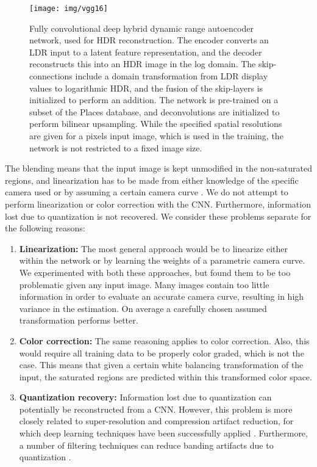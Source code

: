 \documentclass[acmtog]{acmart}
\newcommand\belowfigspace{-2pt}
\begin{document}
\begin{figure*}
	\centering
	\texttt{[image: img/vgg16]}
	\vspace{-1mm}
	\caption{\label{fig:network} Fully convolutional deep hybrid dynamic range autoencoder network, used for HDR reconstruction. The encoder converts an LDR input to a latent feature representation, and the decoder reconstructs this into an HDR image in the log domain. The skip-connections include a domain transformation from LDR display values to logarithmic HDR, and the fusion of the skip-layers is initialized to perform an addition. The network is pre-trained on a subset of the Places database, and deconvolutions are initialized to perform bilinear upsampling. While the specified spatial resolutions are given for a  pixels input image, which is used in the training, the network is not restricted to a fixed image size.}
	\vspace{\belowfigspace}
\end{figure*}

The blending means that the input image is kept unmodified in the non-saturated regions, and linearization has to be made from either knowledge of the specific camera used or by assuming a certain camera curve . We do not attempt to perform linearization or color correction with the CNN. Furthermore, information lost due to quantization is not recovered. We consider these problems separate for the following reasons:
\begin{enumerate}
	\item {\bf Linearization:} The most general approach would be to linearize either within the network or by learning the weights of a parametric camera curve. We experimented with both these approaches, but found them to be too problematic given any input image. Many images contain too little information in order to evaluate an accurate camera curve, resulting in high variance in the estimation. On average a carefully chosen assumed transformation performs better. 
	\item {\bf Color correction:} The same reasoning applies to color correction. Also, this would require all training data to be properly color graded, which is not the case. This means that given a certain white balancing transformation of the input, the saturated regions are predicted within this transformed color space.
	\item {\bf Quantization recovery:} Information lost due to quantization can potentially be reconstructed from a CNN. However, this problem is more closely related to super-resolution and compression artifact reduction, for which deep learning techniques have been successfully applied \cite{Dong2015,Ledig2016,Svoboda2016}. Furthermore, a number of filtering techniques can reduce banding artifacts due to quantization \cite{Daly2004,Bhagavathy2007}.
\end{enumerate}
\end{document}
